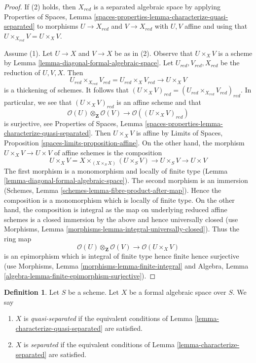 \documentclass{stacks-project}
\theoremstyle{plain}
\theoremstyle{definition}
\newtheorem{definition}[subsection]{Definition}
\theoremstyle{remark}
\numberwithin{equation}{subsection}
\begin{document}
\begin{proof}
If (2) holds, then $X_{red}$ is a separated algebraic space
by applying Properties of Spaces, Lemma
\ref{spaces-properties-lemma-characterize-quasi-separated}
to morphisms $U \to X_{red}$ and $V \to X_{red}$
with $U, V$ affine and using that $U \times_{X_{red}} V = U \times_X V$.

\medskip\noindent
Assume (1). Let $U \to X$ and $V \to X$ be as in (2).
Observe that $U \times_X V$ is a scheme by
Lemma \ref{lemma-diagonal-formal-algebraic-space}.
Let $U_{red}, V_{red}, X_{red}$ be the reduction of $U, V, X$.
Then
$$
U_{red} \times_{X_{red}} V_{red} = U_{red} \times_X V_{red} \to U \times_X V
$$
is a thickening of schemes. It follows that
$(U \times_X V)_{red} = (U_{red} \times_{X_{red}} V_{red})_{red}$.
In particular, we see that $(U \times_X V)_{red}$ is an affine scheme
and that
$$
\mathcal{O}(U) \otimes_\mathbf{Z} \mathcal{O}(V)
\longrightarrow
\mathcal{O}((U \times_X V)_{red})
$$
is surjective, see Properties of Spaces, Lemma
\ref{spaces-properties-lemma-characterize-quasi-separated}.
Then $U \times_X V$ is affine by
Limits of Spaces, Proposition \ref{spaces-limits-proposition-affine}.
On the other hand, the morphism $U \times_X V \to U \times V$
of affine schemes is the composition
$$
U \times_X V = X \times_{(X \times_S X)} (U \times_S V)
\to U \times_S V \to U \times V
$$
The first morphism is a monomorphism and locally of finite type
(Lemma \ref{lemma-diagonal-formal-algebraic-space}).
The second morphism is an immersion
(Schemes, Lemma \ref{schemes-lemma-fibre-product-after-map}).
Hence the composition is a monomorphism which is locally of finite type.
On the other hand, the composition is integral as the map on
underlying reduced affine schemes is a closed immersion
by the above and hence universally closed (use
Morphisms, Lemma \ref{morphisms-lemma-integral-universally-closed}).
Thus the ring map
$$
\mathcal{O}(U) \otimes_\mathbf{Z} \mathcal{O}(V)
\longrightarrow
\mathcal{O}(U \times_X V)
$$
is an epimorphism which is integral of finite type
hence finite hence surjective (use
Morphisms, Lemma \ref{morphisms-lemma-finite-integral}
and
Algebra, Lemma \ref{algebra-lemma-finite-epimorphism-surjective}).
\end{proof}

\begin{definition}
\label{definition-separated}
Let $S$ be a scheme. Let $X$ be a formal algebraic space over $S$.
We say
\begin{enumerate}
\item $X$ is {\it quasi-separated} if the equivalent conditions of
Lemma \ref{lemma-characterize-quasi-separated} are satisfied.
\item $X$ is {\it separated} if the equivalent conditions of
Lemma \ref{lemma-characterize-separated} are satisfied.
\end{enumerate}
\end{definition}
\end{document}
